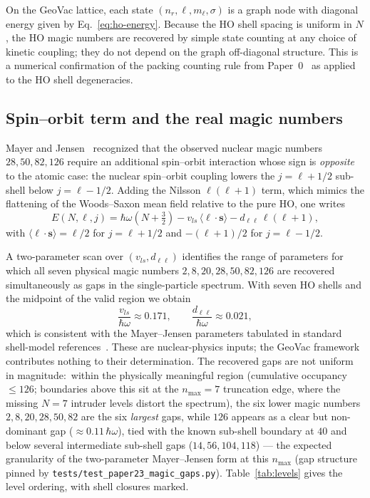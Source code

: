 \documentclass[twocolumn,prc,amsmath,amssymb,superscriptaddress]{revtex4-2}
\begin{document}
On the GeoVac lattice, each state $(n_r, \ell, m_\ell, \sigma)$ is a
graph node with diagonal energy given by
Eq.~\eqref{eq:ho-energy}. Because the HO shell spacing is uniform in
$N$, the HO magic numbers are recovered by simple state counting at any
choice of kinetic coupling; they do not depend on the graph off-diagonal
structure. This is a numerical confirmation of the packing counting
rule from Paper~0~\cite{Paper0} as applied to the HO shell degeneracies.

\subsection{Spin--orbit term and the real magic numbers}

Mayer and Jensen~\cite{Mayer1949,Jensen1949} recognized that the
observed nuclear magic numbers $28, 50, 82, 126$ require an additional
spin--orbit interaction whose sign is \emph{opposite} to the atomic
case: the nuclear spin--orbit coupling lowers the $j = \ell + 1/2$
sub-shell below $j = \ell - 1/2$. Adding the Nilsson $\ell(\ell+1)$
term, which mimics the flattening of the Woods--Saxon mean field
relative to the pure HO, one writes
\begin{equation}
  E(N,\ell,j) = \hbar\omega\left(N + \tfrac{3}{2}\right)
  - v_{ls}\,\langle\boldsymbol{\ell}\cdot\mathbf{s}\rangle
  - d_{\ell\ell}\,\ell(\ell+1),
\label{eq:mayer-jensen}
\end{equation}
with $\langle \boldsymbol{\ell}\cdot\mathbf{s}\rangle = \ell/2$ for
$j = \ell + 1/2$ and $-(\ell+1)/2$ for $j = \ell - 1/2$.

A two-parameter scan over $(v_{ls}, d_{\ell\ell})$ identifies the range
of parameters for which all seven physical magic numbers $2, 8, 20, 28,
50, 82, 126$ are recovered simultaneously as gaps in the single-particle
spectrum. With seven HO shells and the midpoint of the valid region we
obtain
\begin{equation}
  \frac{v_{ls}}{\hbar\omega} \approx 0.171, \qquad
  \frac{d_{\ell\ell}}{\hbar\omega} \approx 0.021 ,
\label{eq:optimal}
\end{equation}
which is consistent with the Mayer--Jensen parameters tabulated in
standard shell-model references~\cite{Suhonen2007,Talmi1993}. These
are nuclear-physics inputs; the GeoVac framework contributes nothing
to their determination. The recovered gaps are not uniform in
magnitude:\ within the physically meaningful region (cumulative
occupancy $\leq 126$; boundaries above this sit at the $n_{\max}=7$
truncation edge, where the missing $N=7$ intruder levels distort the
spectrum), the six lower magic numbers $2, 8, 20, 28, 50, 82$ are the
six \emph{largest} gaps, while $126$ appears as a clear but
non-dominant gap ($\approx 0.11\,\hbar\omega$), tied with the known
sub-shell boundary at $40$ and below several intermediate sub-shell
gaps ($14, 56, 104, 118$) --- the expected granularity of the
two-parameter Mayer--Jensen form at this $n_{\max}$ (gap structure
pinned by \texttt{tests/test\_paper23\_magic\_gaps.py}). Table~\ref{tab:levels}
gives the level ordering, with shell closures marked.
\end{document}

